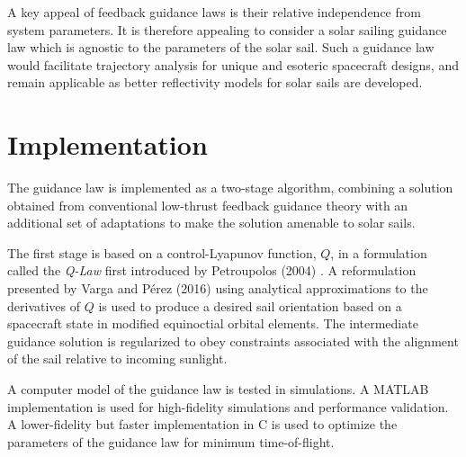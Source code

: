 A key appeal of feedback guidance laws is their relative independence from system parameters. It is therefore appealing to consider a solar sailing guidance law which is agnostic to the parameters of the solar sail. Such a guidance law would facilitate trajectory analysis for unique and esoteric spacecraft designs, and remain applicable as better reflectivity models for solar sails are developed.

\section{Implementation}
The guidance law is implemented as a two-stage algorithm, combining a solution obtained from conventional low-thrust feedback guidance theory with an additional set of adaptations to make the solution amenable to solar sails.

The first stage is based on a control-Lyapunov function, $Q$, in a formulation called the \textit{Q-Law} first introduced by Petroupolos (2004) \cite{petropoulos2004low}. A reformulation presented by Varga and Pérez (2016) \cite{vargaperez2016} using analytical approximations to the derivatives of $Q$ is used to produce a desired sail orientation based on a spacecraft state in modified equinoctial orbital elements. The intermediate guidance solution is regularized to obey constraints associated with the alignment of the sail relative to incoming sunlight.

A computer model of the guidance law is tested in simulations. A MATLAB implementation is used for high-fidelity simulations and performance validation. A lower-fidelity but faster implementation in C is used to optimize the parameters of the guidance law for minimum time-of-flight.